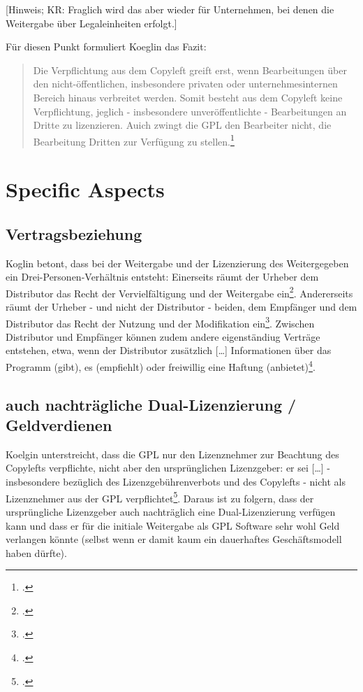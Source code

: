 \documentclass[DIV=calc,BCOR=5mm,11pt,headings=small,oneside,abstract=true, toc=bib]{scrartcl}
\begin{document}
[Hinweis; KR: Fraglich wird das aber wieder für Unternehmen, bei denen die
Weitergabe über Legaleinheiten erfolgt.]

Für diesen Punkt formuliert Koeglin das Fazit:

\begin{quote}\glqq{}Die Verpflichtung aus dem Copyleft greift erst, wenn
Bearbeitungen über den nicht-öffentlichen, insbesondere privaten oder
unternehmesinternen Bereich hinaus verbreitet werden. Somit besteht aus dem
Copyleft keine Verpflichtung, jeglich - insbesondere unveröffentlichte -
Bearbeitungen an Dritte zu lizenzieren. Auich zwingt die GPL den Bearbeiter
nicht, die Bearbeitung Dritten zur Verfügung zu
stellen.\grqq{}\footcite[vgl.][2227]{Koglin2007a}
\end{quote}

\section{Specific Aspects}

\subsection{Vertragsbeziehung}

Koglin betont, dass bei der Weitergabe und der Lizenzierung des Weitergegeben
ein \glqq{}Drei-Personen-Verhältnis\grqq{} entsteht: Einerseits räumt der
\glqq{}Urheber\grqq{} dem \glqq{}Distributor\grqq{} das Recht der
Vervielfältigung und der Weitergabe ein\footcite[vgl.][32]{Koglin2007a}.
Andererseits räumt der \glqq{}Urheber\grqq{} - und nicht der Distributor -
beiden, dem \glqq{}Empfänger\grqq{} und dem \glqq{}Distributor\grqq{} das Recht
der Nutzung und der Modifikation ein\footcite[vgl.][33]{Koglin2007a}. Zwischen
\glqq{}Distributor\grqq{} und \glqq{}Empfänger\grqq{} können zudem andere
eigenständiug Verträge entstehen, etwa, wenn der Distributor zusätzlich
\glqq{}[\ldots] Informationen über das Programm (gibt), es (empfiehlt) oder
freiwillig eine Haftung (anbietet)\grqq{}\footcite[vgl.][32]{Koglin2007a}.

\subsection{auch nachträgliche Dual-Lizenzierung / Geldverdienen}

Koelgin unterstreicht, dass die GPL nur den Lizenznehmer zur
Beachtung des Copylefts verpflichte, nicht aber den \glqq{}ursprünglichen
Lizenzgeber\grqq{}: er sei \glqq{}[\ldots] - insbesondere bezüglich des
Lizenzgebührenverbots und des Copylefts - nicht als Lizenznehmer aus der
GPL verpflichtet\grqq{}\footcite[vgl.][185f]{Koglin2007a}. Daraus ist zu
folgern, dass der ursprüngliche Lizenzgeber auch nachträglich eine Dual-Lizenzierung
verfügen kann und dass er für die initiale Weitergabe als GPL Software sehr wohl
Geld verlangen könnte (selbst wenn er damit kaum ein dauerhaftes
Geschäftsmodell haben dürfte).
\end{document}
